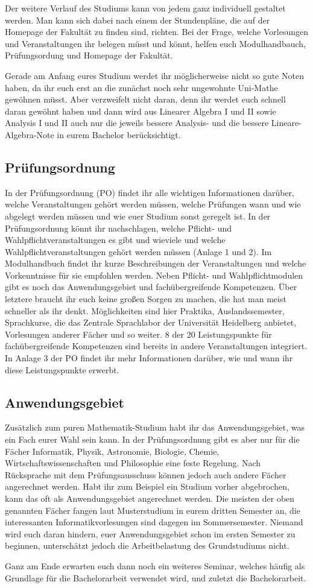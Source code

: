 Der weitere Verlauf des Studiums kann von jedem ganz individuell gestaltet werden.  Man kann sich dabei nach einem der Stundenpläne, die auf der Homepage der Fakultät zu finden sind, richten. Bei der Frage, welche Vorlesungen und Veranstaltungen ihr belegen müsst und könnt, helfen euch Modulhandbauch, Prüfungsordung und Homepage der Fakultät.

Gerade am Anfang eures Studium werdet ihr möglicherweise nicht so gute Noten haben, da ihr euch erst an die zunächst noch sehr ungewohnte Uni-Mathe gewöhnen müsst. Aber verzweifelt nicht daran, denn ihr werdet euch schnell daran gewöhnt haben und dann wird aus Linearer Algebra I und II sowie Analysis I und II  auch nur die jeweils bessere Analysis- und die bessere Lineare-Algebra-Note in eurem Bachelor berücksichtigt.

\subsection{Prüfungsordnung}

In der Prüfungsordnung (PO) findet ihr alle wichtigen Informationen darüber, welche Veranstaltungen gehört werden müssen, welche Prüfungen wann und wie abgelegt werden müssen und wie euer Studium sonst geregelt ist.  In der Prüfungsordnung könnt ihr nachschlagen, welche Pflicht- und Wahlpflichtveranstaltungen es gibt und wieviele und welche Wahlpflichtveranstaltungen gehört werden müssen (Anlage 1 und 2).  Im Modulhandbuch findet ihr kurze Beschreibungen der Veranstaltungen und welche Vorkenntnisse für sie empfohlen werden.  Neben Pflicht- und Wahlpflichtmodulen gibt es noch das Anwendungsgebiet und fachübergreifende Kompetenzen.  Über letztere braucht ihr euch keine großen Sorgen zu machen, die hat man meist schneller als ihr denkt. Möglichkeiten sind hier Praktika, Auslandssemester, Sprachkurse, die das Zentrale Sprachlabor der Universität Heidelberg anbietet, Vorlesungen anderer Fächer und so weiter. 8 der 20 Leistungspunkte für fachübergreifende Kompetenzen sind bereits in andere Veranstaltungen integriert.  In Anlage 3 der PO findet ihr mehr Informationen darüber, wie und wann ihr diese Leistungspunkte erwerbt.


\subsection{Anwendungsgebiet}

Zusätzlich zum puren Mathematik-Studium habt ihr das Anwendungsgebiet, was ein Fach eurer Wahl sein kann.  In der Prüfungsordnung gibt es aber nur für die Fächer Informatik, Physik, Astronomie, Biologie, Chemie, Wirtschaftswissenschaften und Philosophie eine feste Regelung. Nach Rücksprache mit dem Prüfungsausschuss können jedoch auch andere Fächer angerechnet werden. Habt ihr zum Beispiel ein Studium vorher abgebrochen, kann das oft als Anwendungsgebiet angerechnet werden.  Die meisten der oben genannten Fächer fangen laut Musterstudium in eurem dritten Semester an, die interessanten Informatikvorlesungen sind dagegen im Sommersemester.  Niemand wird euch daran hindern, euer Anwendungsgebiet schon im ersten Semester zu beginnen, unterschätzt jedoch die Arbeitbelastung des Grundstudiums nicht.

Ganz am Ende erwarten euch dann noch ein weiteres Seminar, welches häufig als Grundlage für die Bachelorarbeit verwendet wird, und zuletzt die Bachelorarbeit.
